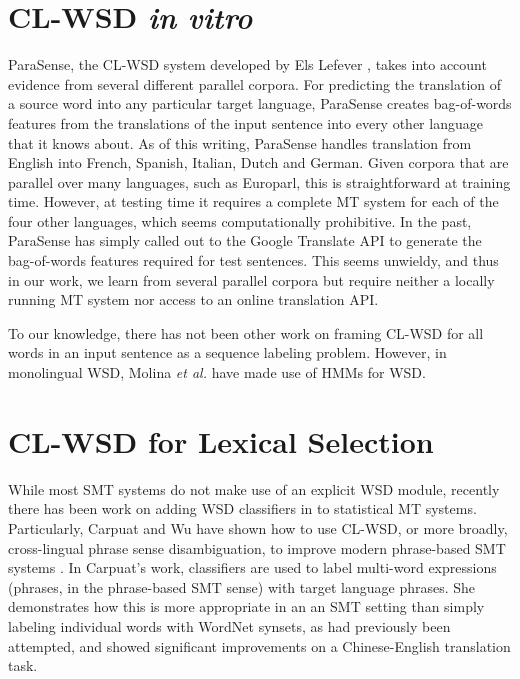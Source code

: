 \section{CL-WSD \emph{in vitro}}
ParaSense, the CL-WSD system developed by Els Lefever
\cite{lefever-hoste-decock:2011:ACL-HLT2011}, takes into account evidence from
several different parallel corpora.
For predicting the translation of a source word into
any particular target language, ParaSense creates
bag-of-words features from the translations of the input sentence into every
other language that it knows about. As of this writing, ParaSense handles
translation from English into French, Spanish, Italian, Dutch and German.
Given corpora that are parallel over many languages, such as Europarl, this is
straightforward at
training time. However, at testing time it requires a complete MT system for
each of the four other languages, which seems computationally prohibitive. In
the past, ParaSense has simply called out to the Google Translate API to
generate the bag-of-words features required for test sentences. This seems
unwieldy, and thus in our work, we learn from several parallel corpora but
require neither a locally running MT system nor access to an online translation
API.

To our knowledge, there has not been other work on framing CL-WSD for all words
in an input sentence as a sequence labeling problem. However, in monolingual
WSD, Molina \textit{et al.} \cite{DBLP:conf/iberamia/MolinaPS02} have made
use of HMMs for WSD. 


\section{CL-WSD for Lexical Selection}
While most SMT systems do not make use of an explicit WSD module, recently
there has been work on adding WSD classifiers in to statistical MT systems.
Particularly, Carpuat and Wu have shown how to use CL-WSD, or more broadly,
cross-lingual phrase sense disambiguation, to improve modern phrase-based SMT
systems
\cite{carpuatpsd,carpuat-wu:2007:EMNLP-CoNLL2007,carpuat2008evaluation}. In
Carpuat's work, classifiers are used to label multi-word expressions (phrases,
in the phrase-based SMT sense) with target language phrases. She demonstrates
how this is more appropriate in an an SMT setting than simply labeling
individual words with WordNet synsets, as had previously been attempted, and
showed significant improvements on a Chinese-English translation task.

